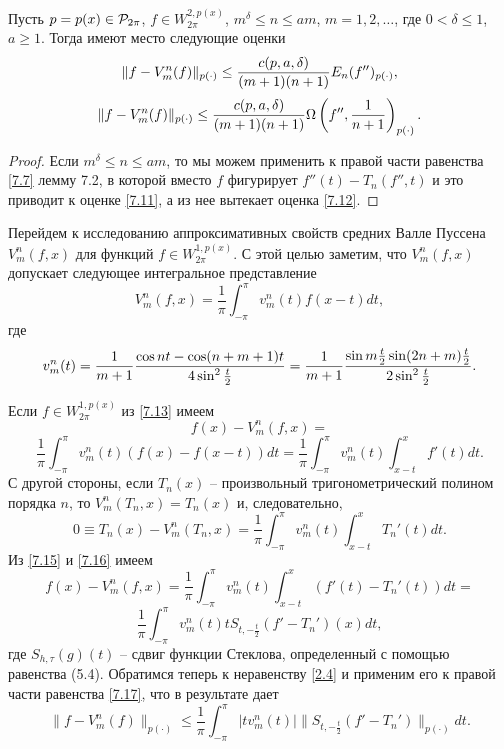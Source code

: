 \begin{theorem}\label{t4}
Пусть  $p=p(x)\in{\cal  P}_{2\pi}$,  $f\in W^{2,p(x)}_{2\pi}$, $m^\delta\le n\le am$, $m=1,2,\ldots$, где $0<\delta\le 1$, $a\ge1$. Тогда имеют место следующие оценки
\begin{equation}\label{7.11}
   \|f-V_m^n(f)\|_{p(\cdot)}\le {c(p,a,\delta)\over(m+1) (n+1)}E_n(f'')_{p(\cdot)},
\end{equation}
\begin{equation}\label{7.12}
   \|f-V_m^n(f)\|_{p(\cdot)}\le {c(p,a,\delta)\over(m+1) (n+1)}\Omega\left(f'',\frac1{n+1}\right)_{p(\cdot)}.
\end{equation}
\end{theorem}
\begin{proof}
Если $m^\delta\le n\le am$, то мы можем применить к правой части равенства \eqref{7.7} лемму 7.2, в которой вместо $f$ фигурирует $f''(t)-T_n(f'',t)$ и это приводит к оценке \eqref{7.11}, а из нее вытекает оценка \eqref{7.12}.
\end{proof}

Перейдем к исследованию аппроксимативных свойств средних Валле Пуссена $V_m^n(f,x)$ для функций $f\in W^{1,p(x)}_{2\pi}$. С этой целью
заметим, что $V_m^n(f,x)$ допускает следующее интегральное представление
\begin{equation}\label{7.13}
    V_m^n(f,x)=\frac1\pi\int_{-\pi}^\pi v_m^n(t)f(x-t)dt,
\end{equation}
где
\begin{equation}\label{7.14}
    v_m^n(t)=\frac1{m+1}{\cos nt-\cos(n+m+1)t\over4\sin^2\frac{t}{2}}=\frac1{m+1}{\sin m\frac{t}{2}\sin(2n+m)\frac{t}{2}\over2\sin^2\frac{t}{2}}.
\end{equation}

Если $f\in W^{1,p(x)}_{2\pi}$ из \eqref{7.13} имеем
$$
f(x)-V_m^n(f,x)=
$$
\begin{equation}\label{7.15}
  \frac1\pi\int_{-\pi}^\pi v_m^n(t)(f(x)-f(x-t))dt=  \frac1\pi\int_{-\pi}^\pi v_m^n(t)\int_{x-t}^xf'(t)dt.
\end{equation}
С другой стороны, если  $T_n(x)$ -- произвольный тригонометрический полином порядка $n$, то
$V_m^n(T_n,x)=T_n(x)$ и, следовательно,
 \begin{equation}\label{7.16}
0 \equiv T_n(x)-V_m^n(T_n,x)=  \frac1\pi\int_{-\pi}^\pi v_m^n(t)\int_{x-t}^xT_n'(t)dt.
\end{equation}
Из \eqref{7.15} и \eqref{7.16} имеем
$$
f(x)-V_m^n(f,x)= \frac1\pi\int_{-\pi}^\pi v_m^n(t)\int_{x-t}^x(f'(t)-T_n'(t))dt=
$$
\begin{equation}\label{7.17}
 \frac1\pi\int_{-\pi}^\pi v_m^n(t)tS_{t,-\frac{t}{2}}(f'-T_n')(x)dt,
\end{equation}
где $S_{h,\tau}(g)(t)$ -- сдвиг функции Стеклова, определенный с помощью равенства (5.4).
Обратимся теперь к неравенству \eqref{2.4} и применим его к правой части равенства \eqref{7.17}, что в результате дает
\begin{equation}\label{7.18}
    \|f-V_m^n(f)\|_{p(\cdot)}\le \frac1\pi\int_{-\pi}^\pi |tv_m^n(t)|\|S_{t,-\frac{t}{2}}(f'-T_n')\|_{p(\cdot)} dt.
\end{equation}

